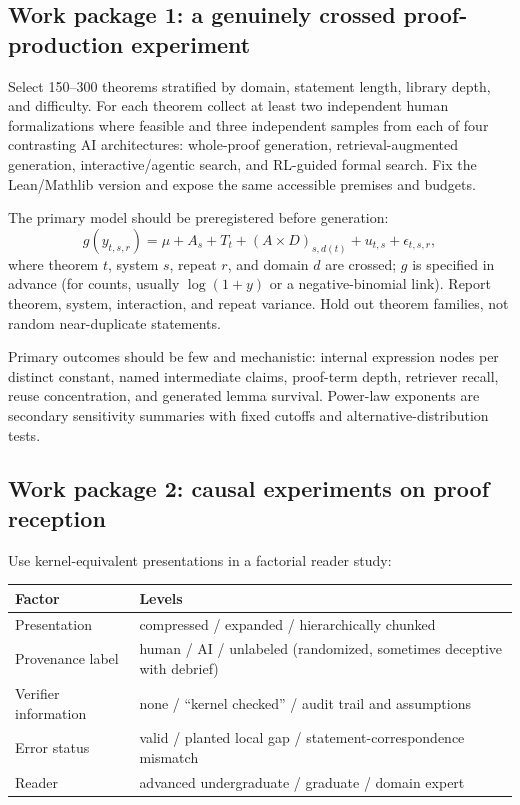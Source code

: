 \documentclass[11pt]{article}
\begin{document}
\subsection{Work package 1: a genuinely crossed proof-production experiment}

Select 150--300 theorems stratified by domain, statement length, library depth, and difficulty.
For each theorem collect at least two independent human formalizations where feasible and three
independent samples from each of four contrasting AI architectures: whole-proof generation,
retrieval-augmented generation, interactive/agentic search, and RL-guided formal search.  Fix the
Lean/Mathlib version and expose the same accessible premises and budgets.

The primary model should be preregistered before generation:
\begin{equation}
  g(y_{t,s,r}) = \mu + A_s + T_t + (A\!\times\!D)_{s,d(t)} + u_{t,s} + \epsilon_{t,s,r},
\end{equation}
where theorem $t$, system $s$, repeat $r$, and domain $d$ are crossed; $g$ is specified in advance
(for counts, usually $\log(1+y)$ or a negative-binomial link).  Report theorem, system, interaction,
and repeat variance.  Hold out theorem families, not random near-duplicate statements.

Primary outcomes should be few and mechanistic: internal expression nodes per distinct constant,
named intermediate claims, proof-term depth, retriever recall, reuse concentration, and generated
lemma survival.  Power-law exponents are secondary sensitivity summaries with fixed cutoffs and
alternative-distribution tests.

\subsection{Work package 2: causal experiments on proof reception}

Use kernel-equivalent presentations in a factorial reader study:
\begin{center}
\begin{tabular}{ll}
\toprule
Factor & Levels \\
\midrule
Presentation & compressed / expanded / hierarchically chunked \\
Provenance label & human / AI / unlabeled (randomized, sometimes deceptive with debrief) \\
Verifier information & none / ``kernel checked'' / audit trail and assumptions \\
Error status & valid / planted local gap / statement-correspondence mismatch \\
Reader & advanced undergraduate / graduate / domain expert \\
\bottomrule
\end{tabular}
\end{center}
\end{document}
